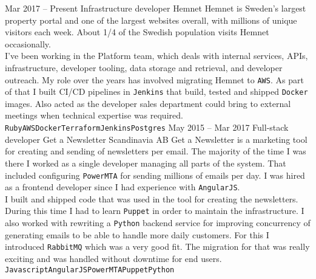 \documentclass[9pt]{developercv} %
\begin{document}

\pagebreak
{}

\begin{entrylist}
  \entry
    {Mar 2017 -- Present}
    {Infrastructure developer}
    {Hemnet}
    {Hemnet is Sweden's largest property portal and one of the largest websites
      overall, with millions of unique visitors each week. About 1/4 of the
      Swedish population visits Hemnet occasionally.\\ I've been working in the
      Platform team, which deals with internal services, APIs, infrastructure,
      developer tooling, data storage and retrieval, and developer outreach. My
      role over the years has involved migrating Hemnet to \texttt{AWS}.
      As part of that I built CI/CD pipelines in \texttt{Jenkins}
      that build, tested and shipped \texttt{Docker} images.
      Also acted as the developer sales department could bring to external meetings
      when technical expertise was required.\\
      \texttt{Ruby}\slashsep\texttt{AWS}\slashsep\texttt{Docker}\slashsep\texttt{Terraform}\slashsep\texttt{Jenkins}\slashsep\texttt{Postgres}}
  \entry
    {May 2015 -- Mar 2017}
    {Full-stack developer}
    {Get a Newsletter Scandinavia AB}
    {Get a Newsletter is a marketing tool for creating and sending of newsletters
      per email. The majority of the time I was there I worked as a single developer
      managing all parts of the system. That included configuring \texttt{PowerMTA}
      for sending millions of emails per day. I was hired as a frontend developer 
      since I had experience with \texttt{AngularJS}.\\ I built and shipped code 
      that was used in the tool for creating the newsletters. During this time I
      had to learn \texttt{Puppet} in order to maintain the infrastructure.
      I also worked with rewriting a \texttt{Python} backend service for improving
      concurrency of generating emails to be able to handle more daily customers.
      For this I introduced \texttt{RabbitMQ} which was a very good fit.
      The migration for that was really exciting and was handled without downtime
      for end users.\\
      \texttt{Javascript}\slashsep\texttt{AngularJS}\slashsep\texttt{PowerMTA}\slashsep\texttt{Puppet}\slashsep\texttt{Python}}

\end{entrylist}
\end{document}
